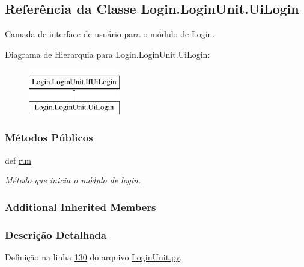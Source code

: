 \hypertarget{classLogin_1_1LoginUnit_1_1UiLogin}{\subsection{Referência da Classe Login.\-Login\-Unit.\-Ui\-Login}
\label{classLogin_1_1LoginUnit_1_1UiLogin}
}


Camada de interface de usuário para o módulo de \hyperlink{namespaceLogin}{Login}.  


Diagrama de Hierarquia para Login.\-Login\-Unit.\-Ui\-Login\-:\begin{figure}[H]
\begin{center}
\leavevmode
\includegraphics[height=2.000000cm]{de/da8/classLogin_1_1LoginUnit_1_1UiLogin}
\end{center}
\end{figure}
\subsubsection*{Métodos Públicos}
\begin{DoxyCompactItemize}
\item 
def \hyperlink{classLogin_1_1LoginUnit_1_1UiLogin_a9cd61a78d5ab0d201051ccf5898f86bc}{run}
\begin{DoxyCompactList}\small\item\em Método que inicia o módulo de login. \end{DoxyCompactList}\end{DoxyCompactItemize}
\subsubsection*{Additional Inherited Members}


\subsubsection{Descrição Detalhada}


Definição na linha \hyperlink{LoginUnit_8py_source_l00130}{130} do arquivo \hyperlink{LoginUnit_8py_source}{Login\-Unit.\-py}.



